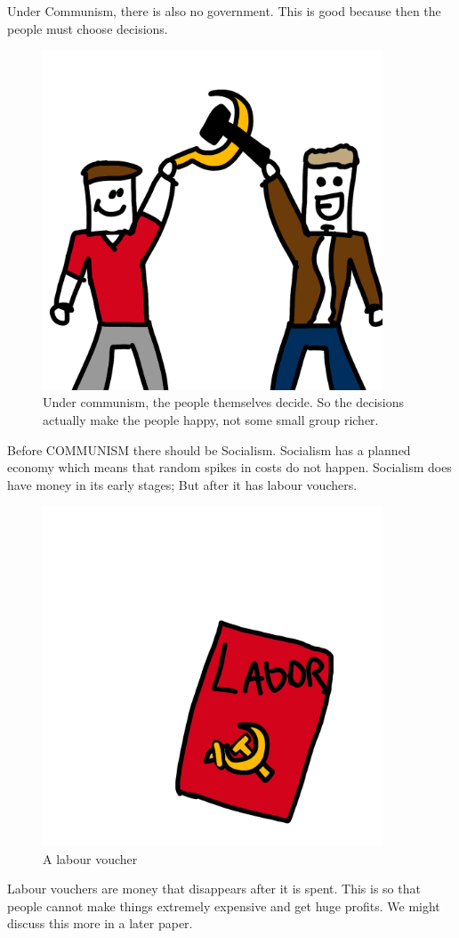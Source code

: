 \documentclass[a4paper]{book} %
\begin{document}
  Under Communism, there is also no government. This is good because then the people must choose decisions.

\begin{figure}[tbhp]
\centering
\includegraphics[width=0.9\textwidth]{2-5.png}
\caption{Under communism, the people themselves decide. So the decisions actually make the people happy, not some small group richer.}
\end{figure}

  Before COMMUNISM there should be Socialism. Socialism has a planned economy which means that random spikes in costs do not happen. Socialism does have money in its early stages; But after it has labour vouchers. 

\begin{figure}[tbhp]
\centering
\includegraphics[width=0.9\textwidth]{2-4.png}
\caption{A labour voucher}
\end{figure}

  Labour vouchers are money that disappears after it is spent. This is so that people cannot make things extremely expensive and get huge profits. We might discuss this more in a later paper.
\end{document}
